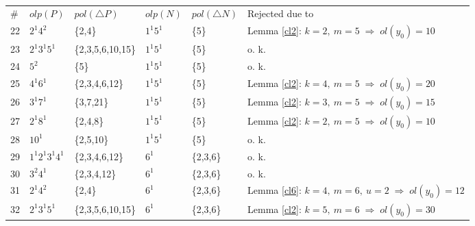 {{{ \ }\\

\begin{flushleft}
\small{
\begin{tabular}{||l|l|l|l|l|l||}      \hline
  $\# $    & $olp(P)$              &$pol(\triangle P) $       &$olp(N)$          & $pol(\triangle N)$      &  Rejected due to \\ \cline{1-6}
    22     & $2^{1}4^{2} $         & {\scriptsize \{2,4\}}  & $1^{1}5^{1}$      & {\scriptsize \{5\}}     & {\scriptsize Lemma \ref{cl2}: $k=2, \ m=5 \; {\Rightarrow} \; ol(y_{0})=10$} \\ \hline 
    23     & $2^{1}3^{1}5^{1}$     & {\scriptsize \{2,3,5,6,10,15\}}& $1^{1}5^{1}$      &  {\scriptsize \{5\}}& {\scriptsize o. k.} \\ \hline 
    24     &$ 5^{2}$               & {\scriptsize \{5\}}    & $1^{1}5^{1}$      & {\scriptsize \{5\}} &  {\scriptsize o. k.}\\ \hline 
    25     & $4^{1}6^{1} $         & {\scriptsize \{2,3,4,6,12\}}& $1^{1}5^{1}$ & {\scriptsize \{5\}}     & {\scriptsize Lemma \ref{cl2}: $k=4, \ m=5 \; {\Rightarrow} \; ol(y_{0})=20$} \\ \hline 
    26     & $3^{1}7^{1}$          & {\scriptsize \{3,7,21\}}& $1^{1}5^{1}$     & {\scriptsize \{5\}}     & {\scriptsize Lemma \ref{cl2}: $k=3, \ m=5 \; {\Rightarrow} \; ol(y_{0})=15$} \\ \hline 
    27     & $2^{1}8^{1}$          & {\scriptsize \{2,4,8\}}& $1^{1}5^{1}$      & {\scriptsize \{5\}}     & {\scriptsize Lemma \ref{cl2}: $k=2, \ m=5 \; {\Rightarrow} \; ol(y_{0})=10$} \\ \hline 
    28     & $10^{1}$              &{\scriptsize \{2,5,10\}}& $1^{1}5^{1}$      & {\scriptsize \{5\}} &{\scriptsize o. k.}\\ \hline 
    29     & $1^{1}2^{1}3^{1}4^{1}$&{\scriptsize \{2,3,4,6,12\}}& $6^{1}$        & {\scriptsize \{2,3,6\}} &{\scriptsize o. k.}\\ \hline    
    30     &$ 3^{2}4^{1}$          &{\scriptsize \{2,3,4,12\}}& $6^{1}$      & {\scriptsize \{2,3,6\}}  &{\scriptsize o. k.}\\ \hline 
    31     & $2^{1}4^{2}$          & {\scriptsize \{2,4\}}  & $6^{1}$      &   {\scriptsize \{2,3,6\}}& {\scriptsize Lemma \ref{cl6}: $k=4, \ m=6, \ u=2 \; {\Rightarrow} \; ol(y_{0})=12$} \\ \hline 
    32     & $2^{1}3^{1}5^{1}$     & {\scriptsize \{2,3,5,6,10,15\}}& $6^{1}$      & {\scriptsize \{2,3,6\}}     & {\scriptsize Lemma \ref{cl2}: $k=5, \ m=6 \; {\Rightarrow} \; ol(y_{0})=30$} \\ \hline  

\end{tabular}}
\end{flushleft}}}
